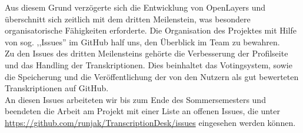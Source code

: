 \documentclass{article}
\begin{document}
Aus diesem Grund verzögerte sich die Entwicklung von OpenLayers und überschnitt sich zeitlich mit dem dritten Meilenstein, 
was besondere organisatorische Fähigkeiten erforderte.
Die Organisation des Projektes mit Hilfe von sog. ,,Issues'' im GitHub half uns, den Überblick im Team zu bewahren.\\
Zu den Issues des dritten Meilensteins gehörte die Verbesserung der Profilseite und das Handling der Transkriptionen.
Dies beinhaltet das Votingsystem, sowie die Speicherung und die Veröffentlichung der von den Nutzern als gut bewerteten Transkriptionen auf GitHub.\\
An diesen Issues arbeiteten wir bis zum Ende des Sommersemesters und beendeten die Arbeit am Projekt mit einer Liste an offenen Issues,
die unter \url{https://github.com/runjak/TranscriptionDesk/issues} eingesehen werden können.
\end{document}
